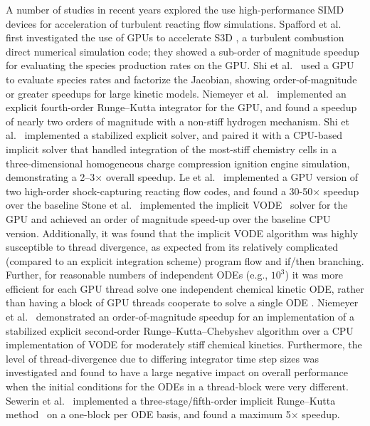 \documentclass[preprint,12pt]{elsarticle}
\begin{document}
A number of studies in recent years explored the use high-performance SIMD devices for acceleration of turbulent reacting flow simulations.
Spafford et al.~\cite{Spafford:2010aa} first investigated the use of GPUs to accelerate S3D \cite{CHEN:2009s3d}, a turbulent combustion direct numerical simulation code; they showed a sub-order of magnitude speedup for evaluating the species production rates on the GPU.
Shi et al.~\cite{Shi:2011aa} used a GPU to evaluate species rates and factorize the Jacobian, showing order-of-magnitude or greater speedups for large kinetic models.
Niemeyer et al.~\cite{Niemeyer:2011aa} implemented an explicit fourth-order Runge--Kutta integrator for the GPU, and found a speedup of nearly two orders of magnitude with a non-stiff hydrogen mechanism.
Shi et al.~\cite{Shi:2012aa} implemented a stabilized explicit solver, and paired it with a CPU-based implicit solver that handled integration of the most-stiff chemistry cells in a three-dimensional homogeneous charge compression ignition engine simulation, demonstrating a 2--3$\times$ overall speedup.
Le et al.~\cite{Le2013596} implemented a GPU version of two high-order shock-capturing reacting flow codes, and found a 30-50$\times$ speedup over the baseline 
Stone et al.~\cite{Stone:2013aa} implemented the implicit VODE~\cite{brown1989vode} solver for the GPU and achieved an order of magnitude speed-up over the baseline CPU version.
Additionally, it was found that the implicit VODE algorithm was highly susceptible to thread divergence, as expected from its relatively complicated (compared to an explicit integration scheme) program flow and if/then branching.
Further, for reasonable numbers of independent ODEs (e.g., $\mathcal{10^3}$) it was more efficient for each GPU thread solve one independent chemical kinetic ODE, rather than having a block of GPU threads cooperate to solve a single ODE \cite{Stone:2013aa}.
Niemeyer et al.~\cite{Niemeyer:2014aa} demonstrated an order-of-magnitude speedup for an implementation of a stabilized explicit second-order Runge--Kutta--Chebyshev algorithm over a CPU implementation of VODE for moderately stiff chemical kinetics.
Furthermore, the level of thread-divergence due to differing integrator time step sizes was investigated and found to have a large negative impact on overall performance when the initial conditions for the ODEs in a thread-block were very different.
Sewerin et al.~\cite{Sewerin20151375} implemented a three-stage\slash fifth-order implicit Runge--Kutta method~\cite{hairer1996solving} on a one-block per ODE basis, and found a maximum 5$\times$ speedup.
\end{document}
